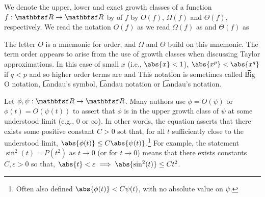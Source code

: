We denote the upper, lower and exact growth classes of a function $f: \R  \to \R $ by of $f$ by $O(f)$, $\Omega (f)$ and $\Theta (f)$, respectively.
We read the notation $O(f)$ as  we read $\Omega (f)$ as  and $\Theta (f)$ as 

The letter $O$ is a mnemonic for order, and $\Omega $ and $\Theta $ build on this mnemonic.
The term order appears to arise from the use of growth classes when discussing Taylor approximations.
In this case of small $x$ (i.e., $\abs{x} < 1$), $\abs{x^p} < \abs{x^q}$ if $q < p$ and so higher order terms are  and 
This notation is sometimes called \t{Big O notation}, \t{Landau's symbol}, \t{Landau notation} or \t{Landau's notation}.

Let $\phi , \psi : \R  \to \R $.
Many authors use $\phi  = O(\psi )$ or $\phi (t) = O(\psi (t))$ to assert that $\phi $ is in the upper growth class of $\psi $ at some understood limit (e.g., $0$ or $\infty$).
In other words, the equation asserts that there exists some positive constant $C > 0$ sot that, for all $t$ sufficiently close to the understood limit, $\abs{\phi (t)} \leq C \abs{\psi (t)}$.\footnote{Often also defined $\abs{\phi (t)} < C\psi (t)$, with no absolute value on $\psi $.}
For example, the statement $\sin^2(t) = P(t^2)$ as $t \to 0$ (or for $t \to 0$) means that there exists constants $C, \varepsilon  > 0$ so that, $\abs{t} < \varepsilon  \implies \abs{\sin^2(t)} \leq Ct^2$.
